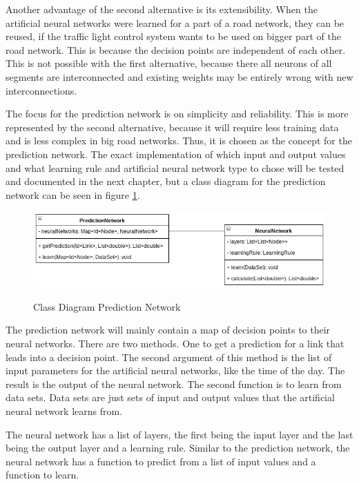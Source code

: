 Another advantage of the second alternative is its extensibility. When the artificial neural networks were learned for a part of a road network, they can be reused, if the traffic light control system wants to be used on bigger part of the road network. This is because the decision points are independent of each other. This is not possible with the first alternative, because there all neurons of all segments are interconnected and existing weights may be entirely wrong with new interconnections.

The focus for the prediction network is on simplicity and reliability. This is more represented by the second alternative, because it will require less training data and is less complex in big road networks. Thus, it is chosen as the concept for the prediction network. The exact implementation of which input and output values and what learning rule and artificial neural network type to chose will be tested and documented in the next chapter, but a class diagram for the prediction network can be seen in figure \ref{predictionNetwork}.

\begin{figure}[!ht]
  \centering
  \includegraphics[width=16cm]{figures/predictionNetwork}
  \label{predictionNetwork}
  \caption[Class Diagram Prediction Network]{Class Diagram Prediction Network \protect\footnotemark}
\end{figure}


The prediction network will mainly contain a map of decision points to their neural networks. There are two methods. One to get a prediction for a link that leads into a decision point. The second argument of this method is the list of input parameters for the artificial neural networks, like the time of the day. The result is the output of the neural network. The second function is to learn from data sets. Data sets are just sets of input and output values that the artificial neural network learns from.

The neural network has a list of layers, the first being the input layer and the last being the output layer and a learning rule. Similar to the prediction network, the neural network has a function to predict from a list of input values and a function to learn.


